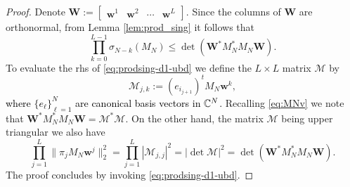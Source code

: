 \documentclass{amsart}
\numberwithin{equation}{section}
\def\corAB{}
\def\corOZ{}
\def\corABrev{\textcolor{black}}
\newcommand{\abbr}[1]{{\sc\lowercase{#1}}}
\begin{document}
\begin{proof}
  \corAB{Denote ${\bm W}:=\begin{bmatrix}{\bm w}^1 & {\bm w}^2 & \cdots & {\bm w}^L\end{bmatrix}$. Since the columns of ${\bm W}$ are orthonormal, from Lemma \ref{lem:prod_sing} it follows that
\begin{equation}\label{eq:prodsing-d1-ubd}
\prod_{k=0}^{{L}-1} \sigma_{N-k}(M_N) \le \det({\bm W}^* M_N^* M_N {\bm W}).
\end{equation}
To evaluate the \abbr{RHS} of \eqref{eq:prodsing-d1-ubd} we define the $L \times L$} matrix $\mathcal{M}$ by
  \[
    \mathcal{M}_{j,k} := (e_{i_{j+1}})^t M_N {\bm w}^k,
  \]
  \corABrev{where $\{e_\ell\}_{\ell=1}^N$ are canonical basis vectors in $\mathbb{C}^N$.}
\corAB{Recalling \eqref{eq:MNv} we note that ${\bm W}^* M_N^* M_N {\bm W}= \mathcal{M}^* \mathcal{M}$. On the other hand, the matrix $\mathcal{M}$ being} upper triangular we also have
  \begin{equation}\label{eq:detMW}
    \corAB{\prod_{j=1}^{\corAB{L}} \|\pi_j M_N {\bm w}^j\|_2^2
    =\prod_{j=1}^{\corAB{L}} |\mathcal{M}_{j,j}|^2
    =|\det \mathcal{M}|^2 = \det({\bm W}^* M_N^* M_N {\bm W}).}
  \end{equation}
  \corOZ{The proof concludes by invoking \eqref{eq:prodsing-d1-ubd}.}
 \end{proof}

\end{document}

